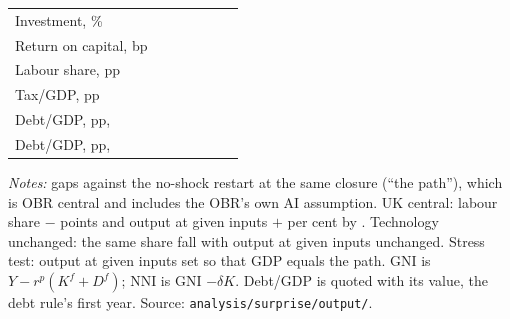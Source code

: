 \begin{table}[htbp]
\begin{tabular}{lrrrrrr}
Investment, \%           & \genUkCentralMainInvestmentCentral{} & \genUkCentralMainInvestmentBound{} & \genUkCentralFlatInvestmentCentral{} & \genUkCentralFlatInvestmentBound{} & \genUkCentralStressInvestmentCentral{} & \genUkCentralStressInvestmentBound{} \\
Return on capital, bp    & \genUkCentralMainInterestBpCentral{} & \genUkCentralMainInterestBpBound{} & \genUkCentralFlatInterestBpCentral{} & \genUkCentralFlatInterestBpBound{} & \genUkCentralStressInterestBpCentral{} & \genUkCentralStressInterestBpBound{} \\
Labour share, pp         & \genUkCentralMainLabourSharePpCentral{} & \genUkCentralMainLabourSharePpBound{} & \genUkCentralFlatLabourSharePpCentral{} & \genUkCentralFlatLabourSharePpBound{} & \genUkCentralStressLabourSharePpCentral{} & \genUkCentralStressLabourSharePpBound{} \\
\addlinespace
Tax/GDP, pp              & \genUkCentralMainTaxGdpPpCentral{} & \genUkCentralMainTaxGdpPpBound{} & \genUkCentralFlatTaxGdpPpCentral{} & \genUkCentralFlatTaxGdpPpBound{} & \genUkCentralStressTaxGdpPpCentral{} & \genUkCentralStressTaxGdpPpBound{} \\
Debt/GDP, pp, \genHeadYear{} & \genUkCentralMainDebtPpCentral{} & \genUkCentralMainDebtPpBound{} & \genUkCentralFlatDebtPpCentral{} & \genUkCentralFlatDebtPpBound{} & \genUkCentralStressDebtPpCentral{} & \genUkCentralStressDebtPpBound{} \\
Debt/GDP, pp, \genDebtRuleYear{} & \genUkCentralMainDebtPpThirtySixCentral{} & \genUkCentralMainDebtPpThirtySixBound{} & \genUkCentralFlatDebtPpThirtySixCentral{} & \genUkCentralFlatDebtPpThirtySixBound{} & \genUkCentralStressDebtPpThirtySixCentral{} & \genUkCentralStressDebtPpThirtySixBound{} \\
\bottomrule
\end{tabular}
\par\medskip
\begin{minipage}{0.95\textwidth}
\footnotesize \emph{Notes:} gaps against the no-shock restart at the same closure (``the path''), which is OBR central and includes the OBR's own AI assumption. UK central: labour share $-$\genUkCentralFallPp{} points and output at given inputs $+$\genUkCentralTfpPct{} per cent by \genHeadYear{}. Technology unchanged: the same share fall with output at given inputs unchanged. Stress test: output at given inputs set so that \genHeadYear{} GDP equals the path. GNI is $Y - r^p(K^f + D^f)$; NNI is GNI $- \delta K$. Debt/GDP is quoted with its \genDebtRuleYear{} value, the debt rule's first year. Source: \texttt{analysis/surprise/output/}.
\end{minipage}
\end{table}

